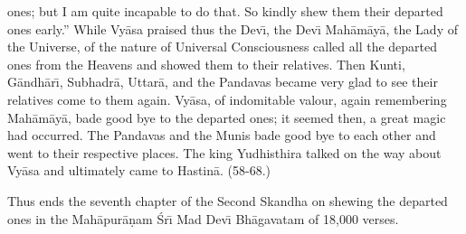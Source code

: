 ones; but I am quite incapable to do that. So kindly shew them their departed ones early.'' While Vy\=asa praised thus the Dev\={\i}, the Dev\={\i} Mah\=am\=ay\=a, the Lady of the Universe, of the nature of Universal Consciousness called all the departed ones from the Heavens and showed them to their relatives. Then Kunti, G\=andh\=ar\={\i}, Subhadr\=a, Uttar\=a, and the Pandavas became very glad to see their relatives come to them again. Vy\=asa, of indomitable valour, again remembering Mah\=am\=ay\=a, bade good bye to the departed ones; it seemed then, a great magic had occurred. The Pandavas and the Munis bade good bye to each other and went to their respective places. The king Yudhisthira talked on the way about Vy\=asa and ultimately came to Hastin\=a. (58-68.)

Thus ends the seventh chapter of the Second Skandha on shewing the departed ones in the Mah\=apur\=a\d{n}am \'Sr\={\i} Mad Dev\={\i} Bh\=agavatam of 18,000 verses.



